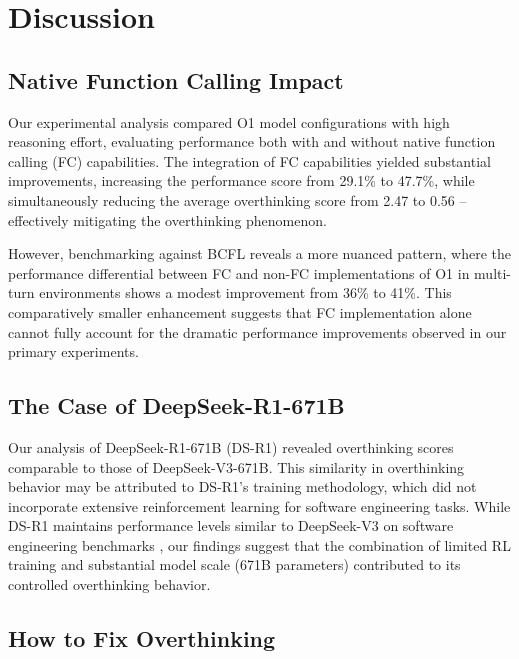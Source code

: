 \chapter{Discussion}
\label{discussion}

\section{Native Function Calling Impact}
\label{sec:function_calling}

Our experimental analysis compared O1 model configurations with high reasoning effort, evaluating performance both with and without native function calling (FC) capabilities. The integration of FC capabilities yielded substantial improvements, increasing the performance score from 29.1\% to 47.7\%, while simultaneously reducing the average overthinking score from 2.47 to 0.56 -- effectively mitigating the overthinking phenomenon.

However, benchmarking against BCFL \cite{berkeley-function-calling-leaderboard} reveals a more nuanced pattern, where the performance differential between FC and non-FC implementations of O1 in multi-turn environments shows a modest improvement from 36\% to 41\%. This comparatively smaller enhancement suggests that FC implementation alone cannot fully account for the dramatic performance improvements observed in our primary experiments.

\section{The Case of DeepSeek-R1-671B}
\label{sec:deepseek}

Our analysis of DeepSeek-R1-671B (DS-R1) revealed overthinking scores comparable to those of DeepSeek-V3-671B. This similarity in overthinking behavior may be attributed to DS-R1's training methodology, which did not incorporate extensive reinforcement learning for software engineering tasks. While DS-R1 maintains performance levels similar to DeepSeek-V3 on software engineering benchmarks \cite{deepseekai2025deepseekr1incentivizingreasoningcapability}, our findings suggest that the combination of limited RL training and substantial model scale (671B parameters) contributed to its controlled overthinking behavior.

\section{How to Fix Overthinking}
\label{sec:solutions}

